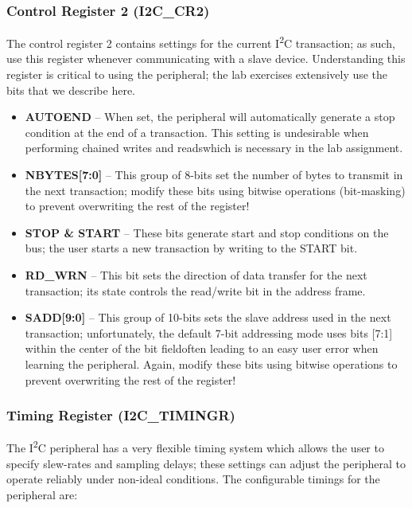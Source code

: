 \documentclass[openany,11pt,fleqn]{book} %
\begin{document}
    \subsubsection{Control Register 2 (I2C\_CR2)}
    The control register 2 contains settings for the current I\textsuperscript{2}C transaction; as such, use this register whenever communicating with a slave device. Understanding this register is critical to using the peripheral; the lab exercises extensively use the bits that we describe here.
    \begin{itemize}
        \item \textbf{AUTOEND} -- When set, the peripheral will automatically generate a stop condition at the end of a transaction. This setting is undesirable when performing chained writes and reads\textemdash which is necessary in the lab assignment. 
        \item \textbf{NBYTES[7:0]} -- This group of 8-bits set the number of bytes to transmit in the next transaction; modify these bits using bitwise operations (bit-masking) to prevent overwriting the rest of the register! 
        \item \textbf{STOP \& START} -- These bits generate start and stop conditions on the bus; the user starts a new transaction by writing to the START bit.
        \item \textbf{RD\_WRN} -- This bit sets the direction of data transfer for the next transaction; its state controls the read/write bit in the address frame. 
        \item \textbf{SADD[9:0]} -- This group of 10-bits sets the slave address used in the next transaction; unfortunately, the default 7-bit addressing mode uses bits [7:1] within the center of the bit field\textemdash often leading to an easy user error when learning the peripheral. Again, modify these bits using bitwise operations to prevent overwriting the rest of the register!
    \end{itemize}
    
    
    \subsubsection{Timing Register (I2C\_TIMINGR)}
    The I\textsuperscript{2}C peripheral has a very flexible timing system which allows the user to specify slew-rates and sampling delays; these settings can adjust the peripheral to operate reliably under non-ideal conditions. The configurable timings for the peripheral are:
    
\end{document}
